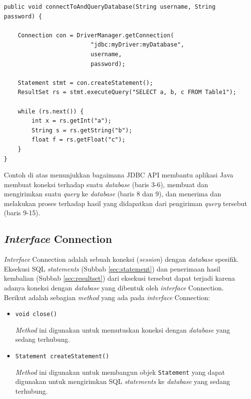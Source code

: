\begin{lstlisting}
public void connectToAndQueryDatabase(String username, String password) {

    Connection con = DriverManager.getConnection(
                         "jdbc:myDriver:myDatabase",
                         username,
                         password);

    Statement stmt = con.createStatement();
    ResultSet rs = stmt.executeQuery("SELECT a, b, c FROM Table1");

    while (rs.next()) {
        int x = rs.getInt("a");
        String s = rs.getString("b");
        float f = rs.getFloat("c");
    }
}
\end{lstlisting}

Contoh di atas menunjukkan bagaimana JDBC API membantu aplikasi Java membuat koneksi terhadap suatu \textit{database} (baris 3-6), membuat dan mengirimkan suatu \textit{query} ke \textit{database} (baris 8 dan 9), dan menerima dan melakukan proses terhadap hasil yang didapatkan dari pengiriman \textit{query} tersebut (baris 9-15).

\subsection{\textit{Interface} Connection}
\label{sec:intercon}
\textit{Interface} Connection adalah sebuah koneksi (\textit{session}) dengan \textit{database} spesifik\cite{javadocumentation}. Eksekusi SQL \textit{statements} (Subbab \ref{sec:statement}) dan penerimaan hasil kembalian (Subbab \ref{sec:resultset}) dari eksekusi tersebut dapat terjadi karena adanya koneksi dengan \textit{database} yang dibentuk oleh \textit{interface} Connection. Berikut adalah sebagian \textit{method} yang ada pada \textit{interface} Connection:
\begin{itemize}
	\item \texttt{void close()}
	
	\textit{Method} ini digunakan untuk memutuskan koneksi dengan \textit{database} yang sedang terhubung.
	
	\item \texttt{Statement createStatement()}
	
	\textit{Method} ini digunakan untuk membangun objek \texttt{Statement} yang dapat digunakan untuk mengirimkan SQL \textit{statements} ke \textit{database} yang sedang terhubung.
\end{itemize}

